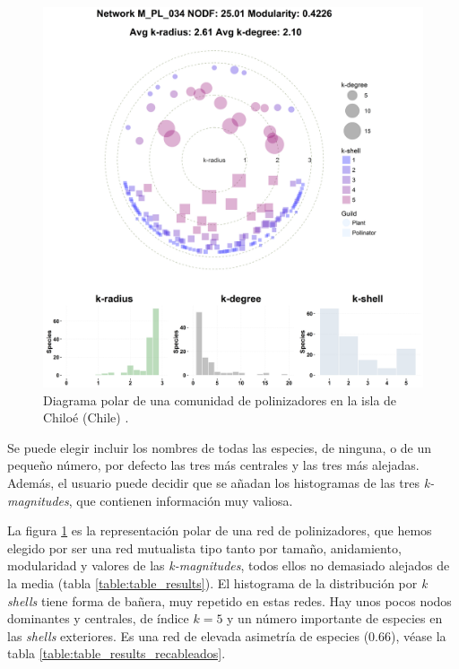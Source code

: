 \begin{figure}[h!]
\centering
\includegraphics[scale=0.4]{Figures/VIS_M_PL_034_polar.png}
\caption[PolarExample]{Diagrama polar de una comunidad de polinizadores en la isla de Chiloé (Chile) \cite{smith2005diversity}.}
\label{fig:VIS_M_PL_034_polar}
\end{figure}

Se puede elegir incluir los nombres de todas las especies, de ninguna, o de un pequeño número, por defecto las tres más centrales y las tres más alejadas. Además, el usuario puede decidir que se añadan los histogramas de las tres \textit{k-magnitudes}, que contienen información muy valiosa.

La figura \ref{fig:VIS_M_PL_034_polar} es la representación polar de una red de polinizadores, que hemos elegido por ser una red mutualista tipo tanto por tamaño, anidamiento, modularidad y valores de las \textit{k-magnitudes}, todos ellos no demasiado alejados de la media (tabla \ref{table:table_results}). El histograma de la distribución por \textit{k shells} tiene forma de bañera, muy repetido en estas redes. Hay unos pocos nodos dominantes y centrales, de índice $k = 5$ y un número importante de especies en las \textit{shells} exteriores. Es una red de elevada asimetría de especies ($0.66$), véase la tabla \ref{table:table_results_recableados}.

